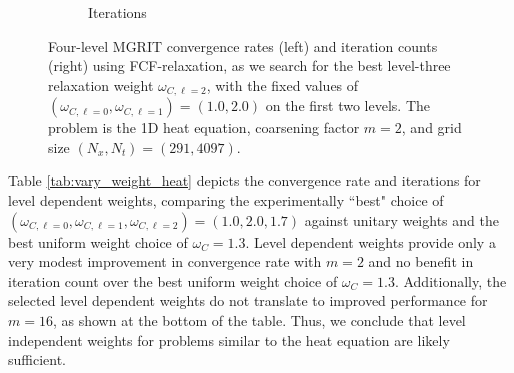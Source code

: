 \documentclass[VANCOUVER,STIX1COL]{WileyNJD-v2}
\begin{document}
\begin{figure}[h!]
\begin{subfigure}[b]{0.4\textwidth}
    \caption{\normalsize Iterations}
    \end{subfigure}
    \caption{Four-level MGRIT convergence rates (left) and iteration counts (right) using FCF-relaxation, as we search 
    for the best level-three relaxation weight $\omega_{C,\ell=2}$, with the fixed values of
    $(\omega_{C,\ell=0}, \omega_{C,\ell=1})=(1.0, 2.0)$ on the first two levels.
    The problem is the 1D heat equation, coarsening factor $m=2$, and grid size $(N_x, N_t) = (291, 4097)$.} 
    \label{fig: Heat1D Multilevel Weight Four-level}
\end{figure}

Table \ref{tab:vary_weight_heat} depicts the convergence rate and iterations for level 
dependent weights, comparing the experimentally ``best" choice of 
$(\omega_{C,\ell=0}, \omega_{C,\ell=1}, \omega_{C,\ell=2})=(1.0, 2.0, 1.7)$ against unitary weights and the best uniform
weight choice of $\omega_C=1.3$.  Level dependent weights provide only a very modest improvement in convergence rate 
with $m=2$ and no benefit in iteration count over the best uniform weight choice of $\omega_C=1.3$.  Additionally, the selected level dependent weights do not 
translate to improved performance for $m=16$, as shown at the bottom of the table.  Thus, we conclude that 
level independent weights for problems similar to the heat equation are likely sufficient.
\end{document}
